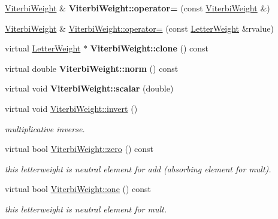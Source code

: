 \begin{DoxyCompactItemize}
\mbox{\hyperlink{classViterbiWeight}{Viterbi\+Weight}} \& {\bfseries Viterbi\+Weight\+::operator=} (const \mbox{\hyperlink{classViterbiWeight}{Viterbi\+Weight}} \&)
\item 
\mbox{\hyperlink{classViterbiWeight}{Viterbi\+Weight}} \& \mbox{\hyperlink{group__weight_ga6624ad5a46c38eeae5382fc00cf4b8a0}{Viterbi\+Weight\+::operator=}} (const \mbox{\hyperlink{classLetterWeight}{Letter\+Weight}} \&rvalue)
\item 
\mbox{\label{group__weight_ga315ec4d2ce14bcdea7b8a3d0c9d278ef}} 
virtual \mbox{\hyperlink{classLetterWeight}{Letter\+Weight}} $\ast$ {\bfseries Viterbi\+Weight\+::clone} () const
\item 
\mbox{\label{group__weight_ga01383c055ca0dafc28870ecd701dbd15}} 
virtual double {\bfseries Viterbi\+Weight\+::norm} () const
\item 
\mbox{\label{group__weight_ga9b7f93efd61f58a88d9274a9e12ebe36}} 
virtual void {\bfseries Viterbi\+Weight\+::scalar} (double)
\item 
virtual void \mbox{\hyperlink{group__weight_ga1fa4dd503a5f4915df2f9c5663aeeaeb}{Viterbi\+Weight\+::invert}} ()
\begin{DoxyCompactList}\small\item\em multiplicative inverse. \end{DoxyCompactList}\item 
\mbox{\label{group__weight_ga35f29b2dcd594cc2cfac884322095c16}} 
virtual bool \mbox{\hyperlink{group__weight_ga35f29b2dcd594cc2cfac884322095c16}{Viterbi\+Weight\+::zero}} () const
\begin{DoxyCompactList}\small\item\em this letterweight is neutral element for add (absorbing element for mult). \end{DoxyCompactList}\item 
\mbox{\label{group__weight_ga31f697ce8283cf19cd1b2f9520c83cde}} 
virtual bool \mbox{\hyperlink{group__weight_ga31f697ce8283cf19cd1b2f9520c83cde}{Viterbi\+Weight\+::one}} () const
\begin{DoxyCompactList}\small\item\em this letterweight is neutral element for mult. \end{DoxyCompactList}\item 

\end{DoxyCompactItemize}
